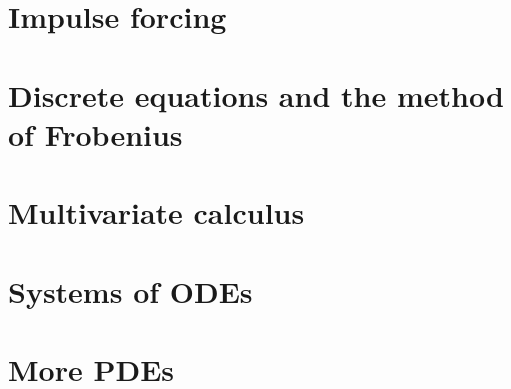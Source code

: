 \documentclass{article}
\begin{document}
\section{Impulse forcing}

\section{Discrete equations and the method of Frobenius}

\section{Multivariate calculus}

\section{Systems of ODEs}

\section{More PDEs}

\end{document}
